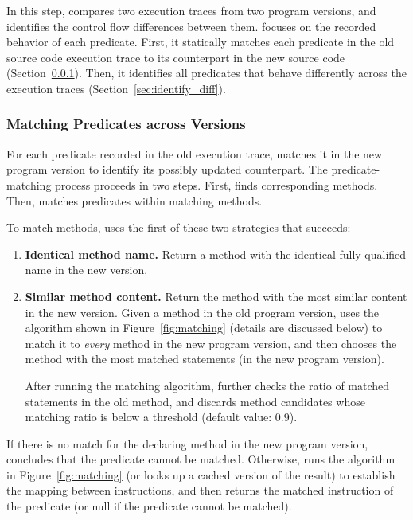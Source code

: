 

In this step, \ourtool compares two execution traces
from two program versions, and identifies the
control flow differences between them. \ourtool focuses on the
recorded behavior of each predicate.
First, it statically
matches each predicate in the old
source code execution trace to its counterpart in the new source code
(Section~\ref{sec:match_predicate}).
Then, it identifies all predicates that
behave differently across the execution traces (Section~\ref{sec:identify_diff}).


\subsubsection{Matching Predicates across Versions}
\label{sec:match_predicate}

For each predicate recorded in the old execution trace,
\ourtool matches it in the new program version to identify
its possibly updated counterpart.
The predicate-matching process proceeds in two steps.
First, \ourtool finds corresponding methods.
Then, \ourtool matches predicates within matching methods.

To match methods, \ourtool uses
the first of these two strategies that succeeds:


\vspace{-1mm}

\begin{enumerate}
\item \textbf{Identical method name.} Return a method with the identical
fully-qualified name in the new version.
\item \textbf{Similar method content.} Return the method with
the most similar content in the new version. Given
a method in the old program version, \ourtool
uses the algorithm shown in Figure~\ref{fig:matching}
(details are discussed below) to match it
to \textit{every} method in the new program version, and then
chooses the method with the most matched statements
(in the new program version).

After running the matching algorithm, \ourtool further checks the ratio of
matched statements in the old method, and discards method candidates whose
matching ratio is below a threshold (default value: 0.9).
\end{enumerate}


If there is no match for the declaring method in the new program
version, \ourtool concludes that the predicate cannot be
matched. Otherwise, \ourtool runs the algorithm
in Figure~\ref{fig:matching} (or looks up a cached version of the result)
to establish the mapping between
instructions, and then returns the matched instruction of the
predicate (or null if the predicate cannot be matched).


